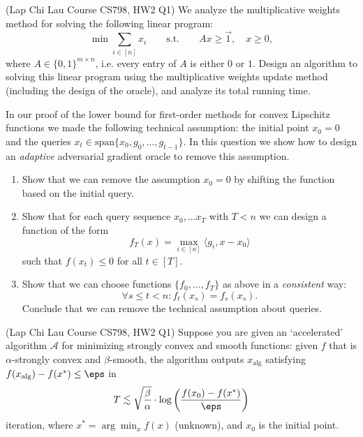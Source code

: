 \documentclass[addpoints,12pt,A4]{exam}
\begin{document}
\begin{questions}
\begin{solution}
\end{solution}



\question (Lap Chi Lau Course CS798, HW2 Q1)
We analyze the multiplicative weights method for solving the following linear program:
\[ \min \sum_{i \in [n]} x_{i} \qquad \text{s.t.} \qquad A x \geq \vec{1}, \quad x \geq 0 ,   \]
where $A \in \{0,1\}^{m \times n}$, i.e. every entry of $A$ is either $0$ or $1$. Design an algorithm to solving this linear program using the multiplicative weights update method (including the design of the oracle), and analyze its total running time.
\begin{solution}
    
\end{solution}


  \question
  In our proof of the lower bound for first-order methods for convex Lipschitz functions we made the following technical assumption: the initial point $x_{0} = 0$ and the queries $x_{t} \in \text{span}\{x_{0}, g_{0}, ..., g_{t-1}\}$. In this question we show how to design an \emph{adaptive} adversarial gradient oracle to remove this assumption. 
  \begin{enumerate}
      \item Show that we can remove the assumption $x_{0} = 0$ by shifting the function based on the initial query. 
      \item Show that for each query sequence $x_{0}, ... x_{T}$ with $T < n$ we can design a function of the form
      \[ f_{T}(x) = \max_{i \in [n]} \langle g_{i}, x - x_{0} \rangle  \]
      such that $f(x_{t}) \leq 0$ for all $t \in [T]$. 
      \item Show that we can choose functions $\{f_{0}, ..., f_{T}\}$ as above in a \emph{consistent} way: 
      \[ \forall s \leq t < n: f_{t}(x_{s}) = f_{s}(x_{s}) . \] Conclude that we can remove the technical assumption about queries. 
  \end{enumerate}
 \begin{solution}
 \end{solution}



\question (Lap Chi Lau Course CS798, HW2 Q1)
Suppose you are given an `accelerated' algorithm $\mathcal{A}$ for minimizing strongly convex and smooth functions: given $f$ that is $\alpha$-strongly convex and $\beta$-smooth, the algorithm outputs $x_{\text{alg}}$ satisfying $f(x_{\text{alg}}) - f(x^{*}) \leq \eps$ in 
\[ T \lesssim \sqrt{ \frac{\beta}{\alpha}} \cdot  \log \bigg( \frac{f(x_{0}) - f(x^{*})}{\eps} \bigg) \]
iteration, where $x^{*} = \arg\min_{x} f(x)$ (unknown), and $x_{0}$ is the initial point. 


\end{questions}
\end{document}
